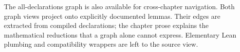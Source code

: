 The all-declarations graph is also available for cross-chapter navigation.
Both graph views project onto explicitly documented lemmas. Their edges are
extracted from compiled declarations; the chapter prose explains the
mathematical reductions that a graph alone cannot express. Elementary Lean
plumbing and compatibility wrappers are left to the source view.
